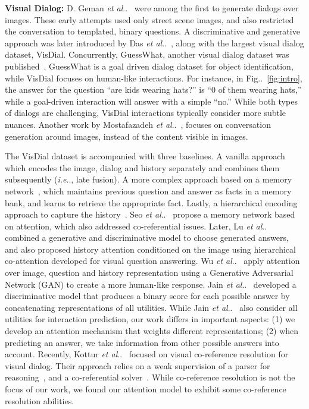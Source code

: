 \documentclass[10pt,twocolumn,letterpaper]{article}
\makeatletter
\def\@onedot{\ifx\@let@token.\else.\null\fi\xspace}
\DeclareRobustCommand\onedot{\futurelet\@let@token\@onedot}
\newcommand{\figref}[1]{Fig\onedot~\ref{#1}}
\def\ie{\emph{i.e}\onedot} \def\Ie{\emph{I.e}\onedot}
\def\etal{\emph{et al}\onedot}
\makeatother
\begin{document}
\noindent\textbf{Visual Dialog:} 
D. Geman \etal~\cite{geman2015visual} were among the first to generate dialogs over images. These early attempts used only street scene images, and also restricted the conversation to templated, binary questions. 
A discriminative and generative approach was later introduced by Das \etal~\cite{visdial}, along with the largest visual dialog dataset, VisDial.  Concurrently, GuessWhat, another visual dialog dataset was published~\cite{de2017guesswhat}.  GuessWhat is a goal driven dialog dataset for object identification, while VisDial focuses on  human-like interactions. For instance, in \figref{fig:intro}, the answer for the question ``are kids wearing hats?'' is ``0 of them wearing hats,'' while a goal-driven interaction will answer with a simple ``no.'' While both types of dialogs are challenging, VisDial interactions typically consider more subtle nuances. 
Another work by Mostafazadeh \etal~\cite{mostafazadeh2017image}, focuses on conversation generation around images, instead of the content visible in images. 

The VisDial dataset is accompanied with three baselines. A vanilla approach which encodes the image, dialog and history separately and combines them subsequently (\ie, late fusion). A more complex approach based on a memory network~\cite{weston2014memory}, which maintains previous question and answer as facts in a memory bank, and learns to retrieve the appropriate fact. Lastly, a hierarchical encoding approach to capture the history~\cite{serban2017hierarchical}.  Seo \etal~\cite{seo2017visual} propose a memory network based on attention, which also addressed co-referential issues. Later, Lu \etal~\cite{lu2017best, lu2016hierarchical} combined a generative and discriminative model to choose generated answers, and also proposed history attention conditioned on the image using   hierarchical co-attention developed for visual question answering. 
Wu \etal~\cite{wu2017you}   apply attention over image, question and history representation using a Generative Adversarial Network (GAN)  to create a more human-like response. 
Jain \etal~\cite{jain2018two} developed a discriminative model that produces a binary score for each possible answer by concatenating representations of all utilities. While Jain \etal~\cite{jain2018two} also consider all utilities for  interaction prediction, our work differs in  important aspects: (1) we develop an attention mechanism that weights different representations; (2) when predicting an answer, we take information from other possible answers into account.  Recently, Kottur \etal~\cite{kottur2018visual} focused on visual co-reference resolution for visual dialog. Their approach relies on a weak supervision of a parser for reasoning~\cite{hu2017learning}, and a co-referential solver~\cite{clark2016deep}. While co-reference resolution is not the focus of our work, we found our attention model to exhibit some  co-reference resolution abilities. 
\end{document}
